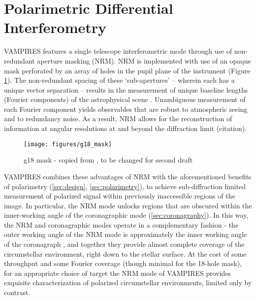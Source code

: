 \section{Polarimetric Differential Interferometry}\label{sec:interferometry}


 
 

VAMPIRES features a single telescope interferometric mode through use of non-redundant aperture masking (NRM). NRM is implemented with use of an opaque mask perforated by an array of holes in the pupil plane of the instrument (Figure \ref{fig:g18_mask}). The non-redundant spacing of these `sub-apertures' -- wherein each has a unique vector separation -- results in the measurement of unique baseline lengths (Fourier components) of the astrophysical scene \citep{tuthill_aperture_2000}. Unambiguous measurement of each Fourier component yields observables that are robust to atmospheric seeing and to redundancy noise. As a result, NRM allows for the reconstruction of information at angular resolutions at and beyond the diffraction limit (citation).


\begin{figure}[h!]
\centering
\texttt{[image: figures/g18\_mask]}
    \caption{\label{fig:g18_mask} g18 mask - copied from \citep{norris_vampires_2015}, to be changed for second draft}
\end{figure}


VAMPIRES combines these advantages of NRM with the aforementioned benefits of polarimetry (\autoref{sec:design}, \autoref{sec:polarimetry}), to achieve sub-diffraction limited measurement of polarized signal within previously inaccessible regions of the image. In particular, the NRM mode unlocks regions that are obscured within the inner-working angle of the coronagraphic mode (\autoref{sec:coronagraphy}). In this way, the NRM and coronagraphic modes operate in a complementary fashion - the outer working angle of the NRM mode is approximately the inner working angle of the coronagraph \citep{norris_vampires_2015}, and together they provide almost complete coverage of the circumstellar environment, right down to the stellar surface. At the cost of some throughput and some Fourier coverage (though minimal for the 18-hole mask), for an appropriate choice of target the NRM mode of VAMPIRES provides exquisite characterization of polarized circumstellar environments, limited only by contrast.


